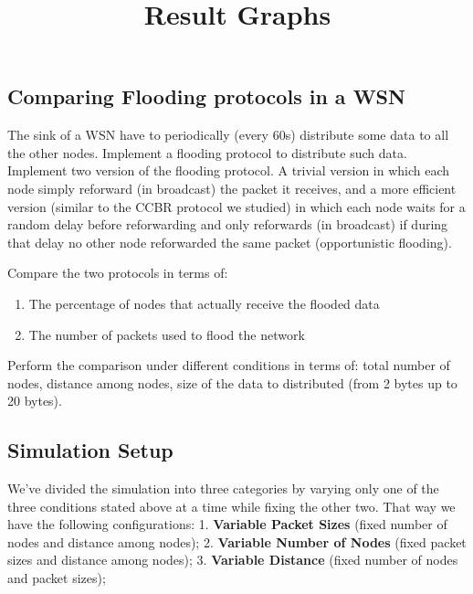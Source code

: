 \documentclass[11pt]{article}
\title{Result Graphs}
\providecommand{\tightlist}{%
      \setlength{\itemsep}{0pt}\setlength{\parskip}{0pt}}
\begin{document}
    
    
    \maketitle
    
    

    
    \hypertarget{comparing-flooding-protocols-in-a-wsn}{%
\subsection{Comparing Flooding protocols in a
WSN}\label{comparing-flooding-protocols-in-a-wsn}}

The sink of a WSN have to periodically (every 60s) distribute some data
to all the other nodes. Implement a flooding protocol to distribute such
data. Implement two version of the flooding protocol. A trivial version
in which each node simply reforward (in broadcast) the packet it
receives, and a more efficient version (similar to the CCBR protocol we
studied) in which each node waits for a random delay before reforwarding
and only reforwards (in broadcast) if during that delay no other node
reforwarded the same packet (opportunistic flooding).

Compare the two protocols in terms of:

\begin{enumerate}
\def\labelenumi{\arabic{enumi}.}
\tightlist
\item
  The percentage of nodes that actually receive the flooded data
\item
  The number of packets used to flood the network
\end{enumerate}

Perform the comparison under different conditions in terms of: total
number of nodes, distance among nodes, size of the data to distributed
(from 2 bytes up to 20 bytes).

    \hypertarget{simulation-setup}{%
\subsection{Simulation Setup}\label{simulation-setup}}

We've divided the simulation into three categories by varying only one
of the three conditions stated above at a time while fixing the other
two. That way we have the following configurations: 1. \textbf{Variable
Packet Sizes} (fixed number of nodes and distance among nodes); 2.
\textbf{Variable Number of Nodes} (fixed packet sizes and distance among
nodes); 3. \textbf{Variable Distance} (fixed number of nodes and packet
sizes);
\end{document}
